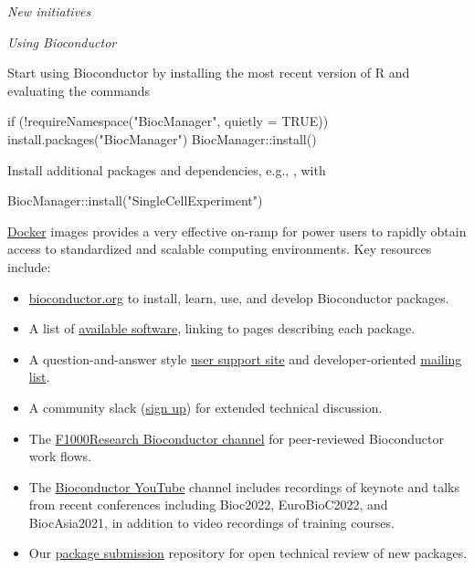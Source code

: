 \textit{New initiatives}

\begin{itemize}
\end{itemize}



\textit{Using Bioconductor}

Start using
Bioconductor by installing the most recent version of R and evaluating
the commands
\begin{example}
  if (!requireNamespace("BiocManager", quietly = TRUE))
      install.packages("BiocManager")
  BiocManager::install()
\end{example}
Install additional packages and dependencies,
e.g., , with
\begin{example}
  BiocManager::install("SingleCellExperiment")
\end{example}
\href{https://bioconductor.org/help/docker/}{Docker}
images provides a very effective on-ramp for power users to rapidly
obtain access to standardized and scalable computing environments.
Key resources include:
\begin{itemize}
\item \href{https://bioconductor.org}{bioconductor.org} to install,
  learn, use, and develop Bioconductor packages.
\item A list of \href{https://bioconductor.org/packages}{available
  software}, linking to pages describing each package.
\item A question-and-answer style
  \href{https://support.bioconductor.org}{user support site} and
  developer-oriented
  \href{https://stat.ethz.ch/mailman/listinfo/bioc-devel}{mailing
    list}.
\item A community slack (\href{https://bioc-community.herokuapp.com/}{sign up})
   for extended technical discussion.
\item The
  \href{https://f1000research.com/channels/bioconductor}{F1000Research
    Bioconductor channel} for peer-reviewed Bioconductor work flows.
\item The \href{https://www.youtube.com/user/bioconductor}{Bioconductor YouTube} 
     channel includes recordings of keynote and talks from recent 
     conferences including Bioc2022, EuroBioC2022, and BiocAsia2021, in addition to 
     video recordings of training courses. 
\item Our \href{https://github.com/Bioconductor/Contributions}{package
  submission} repository for open technical review of new packages.
\end{itemize}

